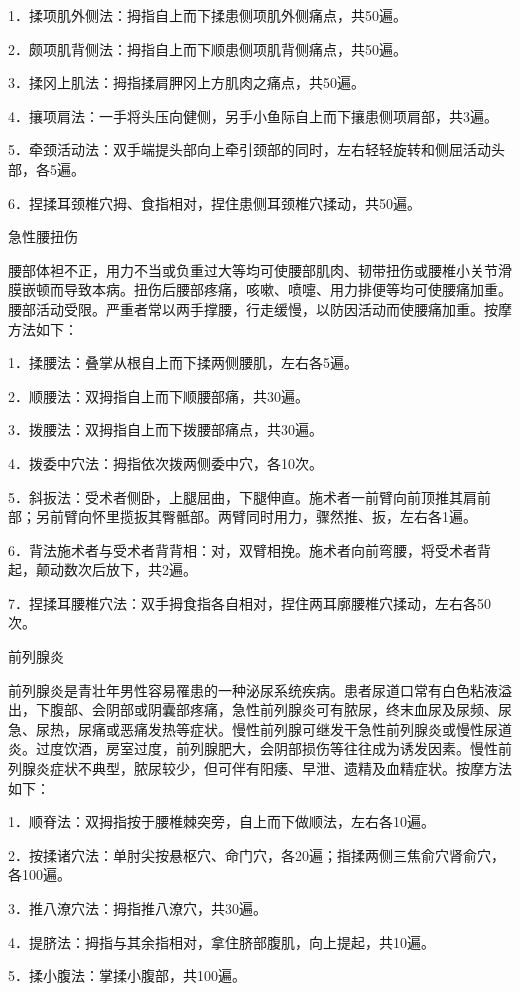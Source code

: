 \documentclass[12pt,UTF8,openany]{ctexbook}
\begin{document}
1．揉项肌外侧法：拇指自上而下揉患侧项肌外侧痛点，共50遍。

2．颇项肌背侧法：拇指自上而下顺患侧项肌背侧痛点，共50遍。

3．揉冈上肌法：拇指揉肩胛冈上方肌肉之痛点，共50遍。

4．攘项肩法：一手将头压向健侧，另手小鱼际自上而下攘患侧项肩部，共3遍。

5．牵颈活动法：双手端提头部向上牵引颈部的同时，左右轻轻旋转和侧屈活动头部，各5遍。

6．捏揉耳颈椎穴拇、食指相对，捏住患侧耳颈椎穴揉动，共50遍。

急性腰扭伤

腰部体袒不正，用力不当或负重过大等均可使腰部肌肉、韧带扭伤或腰椎小关节滑膜嵌顿而导致本病。扭伤后腰部疼痛，咳嗽、喷嚏、用力排便等均可使腰痛加重。腰部活动受限。严重者常以两手撑腰，行走缓慢，以防因活动而使腰痛加重。按摩方法如下：

1．揉腰法：叠掌从根自上而下揉两侧腰肌，左右各5遍。

2．顺腰法：双拇指自上而下顺腰部痛，共30遍。

3．拨腰法：双拇指自上而下拨腰部痛点，共30遍。

4．拨委中穴法：拇指依次拨两侧委中穴，各10次。

5．斜扳法：受术者侧卧，上腿屈曲，下腿伸直。施术者一前臂向前顶推其肩前部；另前臂向怀里揽扳其臀骶部。两臂同时用力，骤然推、扳，左右各1遍。

6．背法施术者与受术者背背相：对，双臂相挽。施术者向前弯腰，将受术者背起，颠动数次后放下，共2遍。

7．捏揉耳腰椎穴法：双手拇食指各自相对，捏住两耳廓腰椎穴揉动，左右各50次。

前列腺炎

前列腺炎是青壮年男性容易罹患的一种泌尿系统疾病。患者尿道口常有白色粘液溢出，下腹部、会阴部或阴囊部疼痛，急性前列腺炎可有脓尿，终末血尿及尿频、尿急、尿热，尿痛或恶痛发热等症状。慢性前列腺可继发干急性前列腺炎或慢性尿道炎。过度饮酒，房室过度，前列腺肥大，会阴部损伤等往往成为诱发因素。慢性前列腺炎症状不典型，脓尿较少，但可伴有阳痿、早泄、遗精及血精症状。按摩方法如下：

1．顺脊法：双拇指按于腰椎棘突旁，自上而下做顺法，左右各10遍。

2．按揉诸穴法：单肘尖按悬枢穴、命门穴，各20遍；指揉两侧三焦俞穴肾俞穴，各100遍。

3．推八潦穴法：拇指推八潦穴，共30遍。

4．提脐法：拇指与其余指相对，拿住脐部腹肌，向上提起，共10遍。

5．揉小腹法：掌揉小腹部，共100遍。
\end{document}
